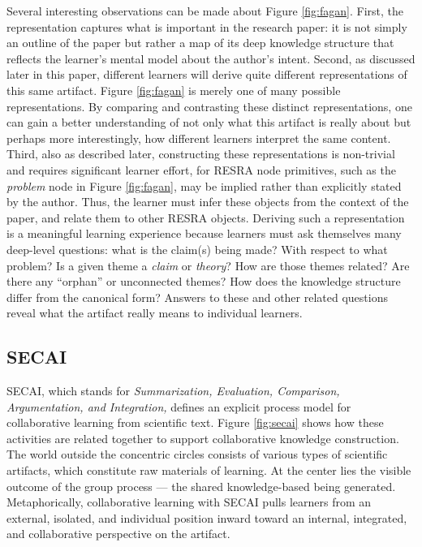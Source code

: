 Several interesting observations can be made about Figure \ref{fig:fagan}.
First, the representation captures what is important in the research paper:
it is not simply an outline of the paper but rather a map of its deep
knowledge structure that reflects the learner's mental model about the
author's intent. Second, as discussed later in this paper, different
learners will derive quite different representations of this same
artifact. Figure \ref{fig:fagan} is merely one of many possible
representations. By comparing and contrasting these distinct
representations, one can gain a better understanding of not only what this
artifact is really about but perhaps more interestingly, how different
learners interpret the same content. Third, also as described later,
constructing these representations is non-trivial and requires significant
learner effort, for RESRA node primitives, such as the {\em problem} node
in Figure \ref{fig:fagan}, may be implied rather than explicitly
stated by the author. Thus, the learner must infer these objects from the
context of the paper, and relate them to other RESRA objects. Deriving such
a representation is a meaningful learning experience because learners must
ask themselves many deep-level questions: what is the claim(s) being made?
With respect to what problem? Is a given theme a {\it claim\/} or {\it
theory\/}? How are those themes related? Are there any ``orphan'' or
unconnected themes?  How does the knowledge structure differ from the
canonical form? Answers to these and other related questions reveal what
the artifact really means to individual learners.

\subsection{SECAI}
\label{sec:secai}

SECAI, which stands for {\it Summarization, Evaluation, Comparison,
Argumentation, and Integration,\/} defines an explicit process model for
collaborative learning from scientific text. Figure \ref{fig:secai} shows
how these activities are related together to support collaborative
knowledge construction. The world outside the concentric circles consists
of various types of scientific artifacts, which constitute raw materials of
learning.  At the center lies the visible outcome of the group process
--- the shared knowledge-based being generated. Metaphorically,
collaborative learning with SECAI pulls learners from an external,
isolated, and individual position inward toward an internal, integrated,
and collaborative perspective on the artifact.

